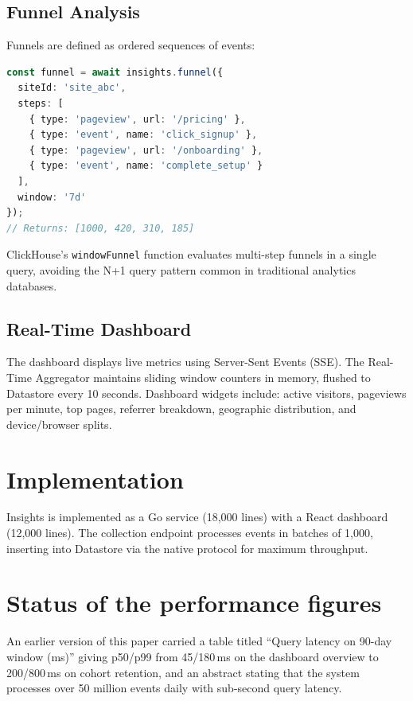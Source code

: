 \documentclass[11pt,twocolumn]{article}
\begin{document}
\subsection{Funnel Analysis}

Funnels are defined as ordered sequences of events:

\begin{lstlisting}[language=TypeScript]
const funnel = await insights.funnel({
  siteId: 'site_abc',
  steps: [
    { type: 'pageview', url: '/pricing' },
    { type: 'event', name: 'click_signup' },
    { type: 'pageview', url: '/onboarding' },
    { type: 'event', name: 'complete_setup' }
  ],
  window: '7d'
});
// Returns: [1000, 420, 310, 185]
\end{lstlisting}

ClickHouse's \texttt{windowFunnel} function evaluates multi-step funnels in a single query, avoiding the N+1 query pattern common in traditional analytics databases.

\subsection{Real-Time Dashboard}

The dashboard displays live metrics using Server-Sent Events (SSE). The Real-Time Aggregator maintains sliding window counters in memory, flushed to Datastore every 10 seconds. Dashboard widgets include: active visitors, pageviews per minute, top pages, referrer breakdown, geographic distribution, and device/browser splits.

\section{Implementation}

Insights is implemented as a Go service (18,000 lines) with a React dashboard (12,000 lines). The collection endpoint processes events in batches of 1,000, inserting into Datastore via the native protocol for maximum throughput.

\section{Status of the performance figures}
\label{sec:figures}

An earlier version of this paper carried a table titled ``Query latency on
90-day window (ms)'' giving p50/p99 from 45/180\,ms on the dashboard overview to
200/800\,ms on cohort retention, and an abstract stating that the system
processes over 50 million events daily with sub-second query latency.
\end{document}
